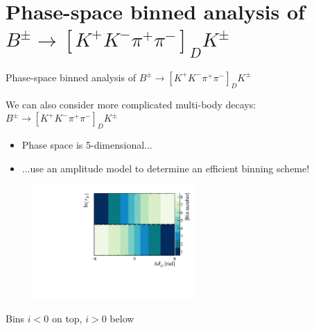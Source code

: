 \documentclass{beamer}
\begin{document}
\section{Phase-space binned analysis of \texorpdfstring{$B^\pm\to[K^+K^-\pi^+\pi^-]_DK^\pm$}{B2DKD2KKpipi}}
\begin{frame}{Phase-space binned analysis of $B^\pm\to[K^+K^-\pi^+\pi^-]_DK^\pm$}
  \begin{center}
    \Large We can also consider more complicated multi-body decays: $B^\pm\to[K^+K^-\pi^+\pi^-]_DK^\pm$
  \end{center}
  \begin{itemize}
    \setlength\itemsep{0.5em}
    \item{Phase space is 5-dimensional...}
    \item{...use an amplitude model to determine an efficient binning scheme!}
  \end{itemize}
  \begin{figure}
    \centering
    \includegraphics[width = 0.55\textwidth]{Plots/BinningSchemePlot_8Bins.pdf}
  \end{figure}
  \vspace{-0.5cm}
  \begin{center}
    Bins $i < 0$ on top, $i > 0$ below
  \end{center}
\end{frame}
\end{document}
